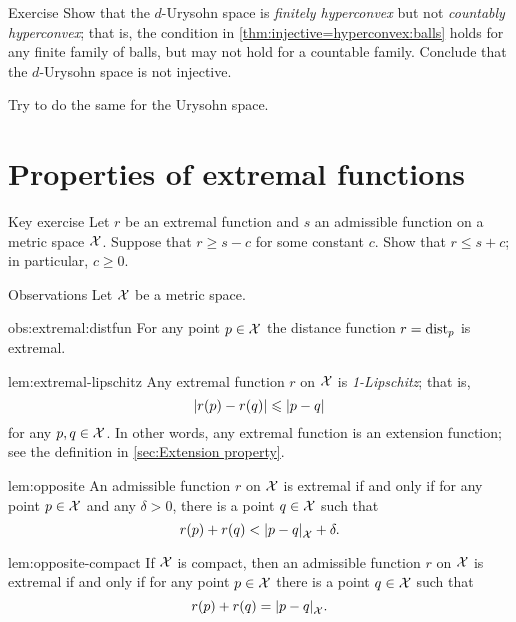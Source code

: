 \begin{thm}{Exercise}\label{ex:urysohn-hyperconvex}
Show that the $d$-Urysohn space is {}\emph{finitely hyperconvex} but not {}\emph{countably hyperconvex};
that is, the condition in \ref{thm:injective=hyperconvex:balls} holds for any finite family of balls, but may not hold for a countable family.
Conclude that the $d$-Urysohn space is not injective.

Try to do the same for the Urysohn space.
\end{thm}

\section{Properties of extremal functions}

\begin{thm}{Key exercise}\label{ex:+-c}
Let $r$ be an extremal function and $s$ an admissible function on a metric space $\mathcal{X}$.
Suppose that $r\ge s-c$ for some constant $c$.
Show that $r\le s+c$; in particular, $c\ge 0$.
\end{thm}

\begin{thm}{Observations}\label{obs:extremal}
Let $\mathcal{X}$ be a metric space.

\begin{subthm}{obs:extremal:distfun}
For any point $p\in\mathcal{X}$
the distance function $r\z=\distfun_p$ is extremal.
\end{subthm}

\begin{subthm}{lem:extremal-lipschitz}
Any extremal function $r$ on $\mathcal{X}$ is \emph{1-Lipschitz};
that is,
\[|r(p)-r(q)|\le \dist{p}{q}{}\]
for any $p,q\in\mathcal{X}$.
In other words, any extremal function is an extension function; see the definition in \ref{sec:Extension property}.
\end{subthm}

\begin{subthm}{lem:opposite}
An admissible function $r$ on $\mathcal{X}$ is extremal if and only if
for any point $p\in\mathcal{X}$ and any $\delta>0$, there is a point $q\in \mathcal{X}$
such that 
\[r(p)+r(q)<\dist{p}{q}{\spc{X}}+\delta.\]
\end{subthm}

\begin{subthm}{lem:opposite-compact}
If $\mathcal{X}$ is compact, then an admissible function $r$ on $\mathcal{X}$ is extremal if and only if
for any point $p\in\mathcal{X}$ there is a point $q\in \mathcal{X}$
such that 
\[r(p)+r(q)=\dist{p}{q}{\spc{X}}.\]
\end{subthm}

\end{thm}

